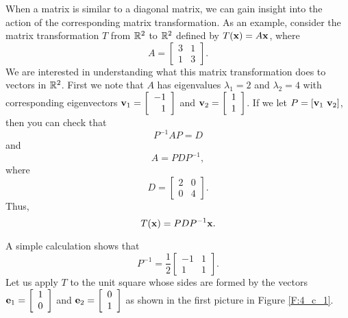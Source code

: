 
When a matrix is similar to a diagonal matrix, we can gain insight into the action of the corresponding matrix transformation. As an example,  consider the matrix transformation $T$ from $\mathbb{R}^2$ to $\mathbb{R}^2$ defined by $T(\mathbf{x}) = A \mathbf{x}$, where
\begin{equation} \label{eq:4_c_1}
A = \left[ \begin{array}{cc} 3&1\\1&3 \end{array} \right].
\end{equation}
We are interested in understanding what this matrix transformation does to vectors in $\mathbb{R}^2$. First we note that $A$ has eigenvalues $\lambda_1 = 2$ and $\lambda_2 = 4$ with corresponding eigenvectors $\mathbf{v}_1 = \left[ \begin{array}{r} -1\\1 \end{array} \right]$ and $\mathbf{v}_2 = \left[ \begin{array}{c} 1\\1 \end{array} \right]$. If we let $P = [\vv_1 \ \vv_2]$, then you can check that 
\[P^{-1}AP = D\]
and
\[A = PDP^{-1},\]
where 
\[D = \left[ \begin{array}{cc} 2 & 0 \\ 0 & 4 \end{array} \right].\]
Thus,
\[T(\mathbf{x}) = PDP^{-1}\mathbf{x}.\]

A simple calculation shows that 
\[P^{-1} = \frac{1}{2}\left[ \begin{array}{rc} -1&1 \\ 1&1 \end{array} \right].\]
Let us apply $T$ to the unit square whose sides are formed by the vectors $\mathbf{e}_1 = \left[ \begin{array}{c} 1 \\ 0 \end{array} \right]$ and $\mathbf{e}_2 = \left[ \begin{array}{c} 0 \\ 1 \end{array} \right]$ as shown in the first picture in Figure \ref{F:4_c_1}. 

